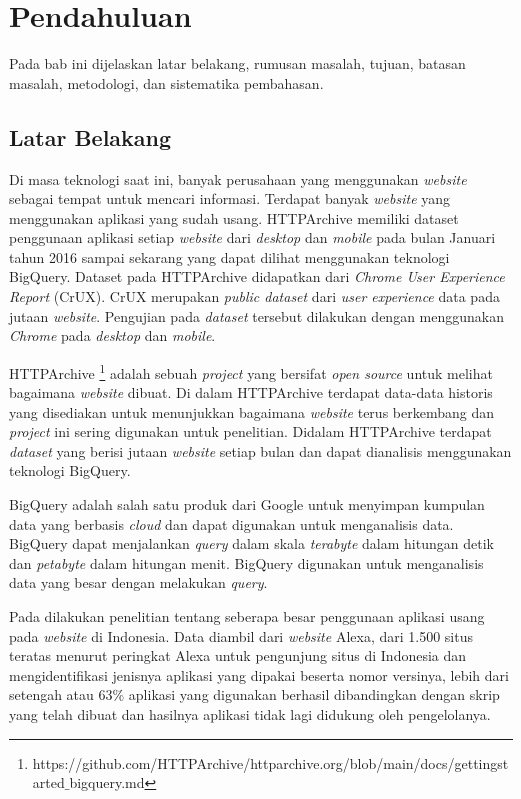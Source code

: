 \chapter{Pendahuluan}
\label{chap:intro}
Pada bab ini dijelaskan latar belakang, rumusan masalah, tujuan, batasan masalah, metodologi, dan sistematika pembahasan.
\section{Latar Belakang}
\label{sec:label}
Di masa teknologi saat ini, banyak perusahaan yang menggunakan \textit{website} sebagai tempat untuk mencari informasi. Terdapat banyak \textit{website} yang menggunakan aplikasi yang sudah usang. HTTPArchive memiliki dataset penggunaan aplikasi setiap \textit{website} dari \textit{desktop} dan \textit{mobile} pada bulan Januari tahun 2016 sampai sekarang yang dapat dilihat menggunakan teknologi BigQuery. Dataset pada HTTPArchive didapatkan dari \textit{Chrome User Experience Report} (CrUX). CrUX merupakan \textit{public dataset} dari \textit{user experience} data pada jutaan \textit{website}. Pengujian pada \textit{dataset} tersebut dilakukan dengan menggunakan \textit{Chrome} pada \textit{desktop} dan \textit{mobile}.  

HTTPArchive \footnote{https://github.com/HTTPArchive/httparchive.org/blob/main/docs/gettingstarted$\_$bigquery.md} adalah sebuah \textit{project} yang bersifat \textit{open source} untuk melihat bagaimana \textit{website} dibuat. Di dalam HTTPArchive terdapat data-data historis yang disediakan untuk menunjukkan bagaimana \textit{website} terus berkembang dan \textit{project} ini sering digunakan untuk penelitian. Didalam HTTPArchive terdapat \textit{dataset} yang berisi jutaan \textit{website} setiap bulan dan dapat dianalisis menggunakan teknologi BigQuery. 

BigQuery \cite{bqIntroduction} adalah salah satu produk dari Google untuk menyimpan kumpulan data yang berbasis \textit{cloud} dan dapat digunakan untuk menganalisis data. BigQuery dapat menjalankan \textit{query} dalam skala \textit{terabyte} dalam hitungan detik dan \textit{petabyte} dalam hitungan menit. BigQuery digunakan untuk menganalisis data yang besar dengan melakukan \textit{query}.  

Pada \cite{pascal} dilakukan penelitian tentang seberapa besar penggunaan aplikasi usang pada \textit{website} di Indonesia. Data diambil dari \textit{website} Alexa, dari 1.500 situs teratas menurut peringkat Alexa untuk pengunjung situs di Indonesia dan mengidentifikasi jenisnya aplikasi yang dipakai beserta nomor versinya, lebih dari setengah atau 63\% aplikasi yang digunakan berhasil dibandingkan dengan skrip yang telah dibuat dan hasilnya aplikasi tidak lagi didukung oleh pengelolanya.

